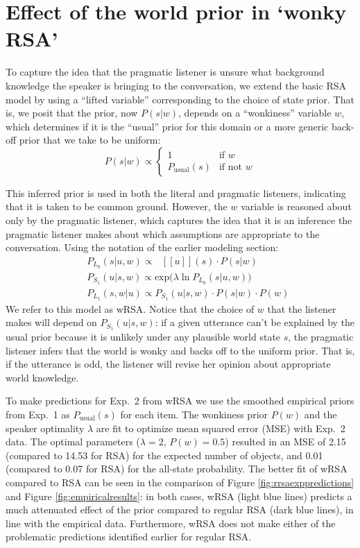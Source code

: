 \documentclass[10pt,letterpaper]{article}
\newcommand{\denote}[1]{\mbox{ $[\![ #1 ]\!]$}}
\newcommand{\figref}[1]{Figure \ref{#1}}
\begin{document}
\section{Effect of the world prior in `wonky RSA'}

To capture the idea that the pragmatic listener is unsure what background knowledge the speaker is bringing to the conversation, we extend the basic RSA model by using a ``lifted variable'' \cite{goodmanlassiter,lassiter2013,bergengoodman2012,kao2014} corresponding to the choice of state prior. That is, we posit that the prior, now $P(s|w)$, depends on a ``wonkiness'' variable $w$, which determines if it is the ``usual'' prior for this domain or a more generic back-off prior that we take to be uniform:
$$
P(s|w) \propto \begin{cases}
1  & \text{if } w\\
   P_{\text{usual}}(s) & \text{if not } w
  \end{cases}
  $$
  
This inferred prior is used in both the literal and pragmatic listeners, indicating that it is taken to be common ground. However, the $w$ variable is reasoned about only by the pragmatic listener, which captures the idea that it is an inference the pragmatic listener makes about which assumptions are appropriate to the conversation. Using the notation of the earlier modeling section:
\begin{eqnarray}
&&P_{L_0}(s|u,w)\propto \denote{u}(s) \cdot P(s|w)\\
&&P_{S_1}(u|s,w) \propto \mathrm{exp}({\lambda \ln P_{L_0}(s|u,w))}\\
&&P_{L_1}(s,w|u)\propto P_{S_1}(u|s,w)\cdot P(s|w) \cdot P(w)
\end{eqnarray}
We refer to this model as wRSA. Notice that the choice of $w$ that the listener makes will depend on $P_{S_1}(u|s,w)$: if a given utterance can't be explained by the usual prior because it is unlikely under any plausible world state $s$, the pragmatic listener infers that the world is wonky and backs off to the uniform prior.
That is, if the utterance is odd, the listener will revise her opinion about appropriate world knowledge.

To make predictions for Exp.~2 from wRSA we use the smoothed empirical priors from Exp.~1 as $P_{\text{usual}}(s)$ for each item. The wonkiness prior $P(w)$ and the speaker optimality $\lambda$ are fit to optimize mean squared error (MSE) with Exp.~2 data. The optimal parameters ($\lambda = 2$, $P(w) = 0.5$) resulted in an MSE of 2.15 (compared to 14.53 for RSA) for the expected number of objects, and 0.01 (compared to 0.07 for RSA) for the all-state probability. The better fit of wRSA compared to RSA can be seen in the comparison of \figref{fig:rrsaexppredictions} and \figref{fig:empiricalresults}: in both cases, wRSA (light blue lines) predicts a much attenuated effect of the prior compared to regular RSA (dark blue lines), in line with the empirical data. Furthermore, wRSA does not make either of the problematic predictions identified earlier for regular RSA.
\end{document}
